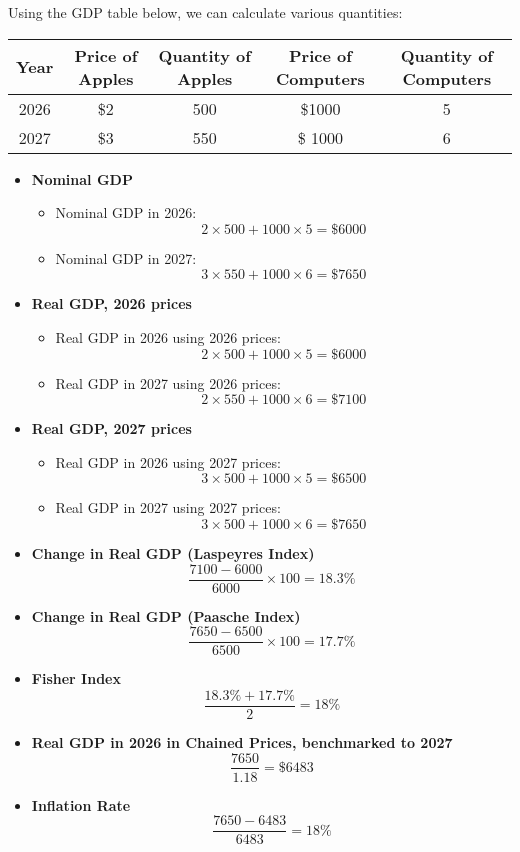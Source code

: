 \documentclass[9pt]{extarticle}
\title{}
\author{Avinash Iyer}
\date{}
\begin{document}
{
Using the GDP table below, we can calculate various quantities:
  \begin{center}
    \begin{tabular}{c|c|c|c|c}
      Year & Price of Apples & Quantity of Apples & Price of Computers & Quantity of Computers\\
      \hline
      2026 & \$2 & 500 & \$1000 & 5 \\
      2027 & \$3 & 550 & \$ 1000 & 6
      \end{tabular}
  \end{center}
  \begin{itemize}
    \item \textbf{Nominal GDP}
        \begin{itemize}
          \item Nominal GDP in 2026:
            \[2\times 500 + 1000 \times 5 = \$6000\]
          \item Nominal GDP in 2027:
            \[3\times 550 + 1000 \times 6 = \$7650\]
        \end{itemize}
    \item \textbf{Real GDP, 2026 prices}
        \begin{itemize}
          \item Real GDP in 2026 using 2026 prices:
            \[2\times 500 + 1000\times 5 = \$6000\]
         \item Real GDP in 2027 using 2026 prices:
              \[2\times 550 + 1000\times 6 = \$7100\]
        \end{itemize}
    \item \textbf{Real GDP, 2027 prices}
          \begin{itemize}
          \item Real GDP in 2026 using 2027 prices:
            \[3\times 500 + 1000\times 5 = \$6500\]
          \item Real GDP in 2027 using 2027 prices:
              \[3\times 500 + 1000\times 6 = \$7650\]
          \end{itemize}
        \item \textbf{Change in Real GDP (Laspeyres Index)}
          \[\frac{7100-6000}{6000}\times 100 = 18.3\%\]
        \item \textbf{Change in Real GDP (Paasche Index)}
          \[\frac{7650-6500}{6500}\times 100 = 17.7\%\]
        \item \textbf{Fisher Index}
          \[\frac{18.3\% + 17.7\%}{2} = 18\%\]
        \item \textbf{Real GDP in 2026 in Chained Prices, benchmarked to 2027}
          \[\frac{7650}{1.18} = \$6483\]
        \item \textbf{Inflation Rate}
          \[\frac{7650-6483}{6483} = 18\%\]
  \end{itemize}
}
\end{document}
